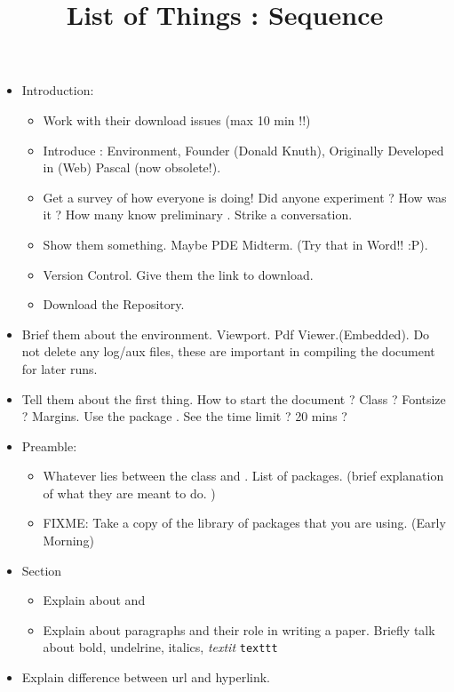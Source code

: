 
\title{List of Things : Sequence}

\maketitle
\begin{itemize}
\item Introduction: 
\begin{itemize}
\item Work with their download issues (max 10 min !!)
\item Introduce \latex: Environment, Founder (Donald Knuth), Originally Developed in (Web) Pascal (now obsolete!). 
\item Get a survey of how everyone is doing! Did anyone experiment ? How was it ? How many know preliminary \latex. Strike a conversation. 
\item Show them something. Maybe PDE Midterm. (Try that in Word!! :P). 
\item Version Control. Give them the link to download. 
\item Download the Repository. 
\end{itemize}
\item Brief them about the environment. Viewport. Pdf Viewer.(Embedded). Do not delete any log/aux files, these are important in compiling the document for later runs. 
\item Tell them about the first thing. How to start the document ? Class ? Fontsize ? Margins. Use the package . See the time limit ? 20 mins ? 
\item Preamble: 
\begin{itemize}
\item Whatever lies between the class and . List of packages. (brief explanation of what they are meant to do. )
\item FIXME: Take a copy of the library of packages that you are using. (Early Morning)
\end{itemize}
\item Section 
\begin{itemize}
\item Explain about  and 
\item Explain about paragraphs and their role in writing a paper. Briefly talk about bold, undelrine, italics,  \textit{textit} \texttt{texttt}
\end{itemize}
\item Explain difference between url and hyperlink. 

\end{itemize}

